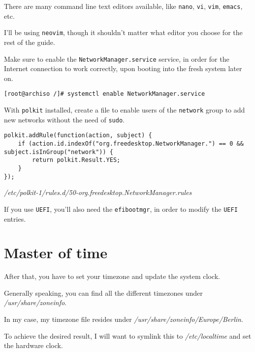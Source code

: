 \documentclass[10pt]{dustdoc}
\begin{document}
\begin{NOTE}
    There are many command line text editors available, like \texttt{nano}, \texttt{vi}, \texttt{vim}, \texttt{emacs}, etc.

    I’ll be using \texttt{neovim}, though it shouldn’t matter what editor you choose for the rest of the guide.
\end{NOTE}

Make sure to enable the \texttt{NetworkManager.service} service, in order for the Internet connection to work correctly, upon booting into the fresh system later on.

\begin{verbatim}
[root@archiso /]# systemctl enable NetworkManager.service
\end{verbatim}

With \texttt{polkit} installed, create a file to enable users of the \texttt{network} group to add new networks without the need of \texttt{sudo}.

\begin{mintedlisting}
    \begin{verbatim}
polkit.addRule(function(action, subject) {
    if (action.id.indexOf("org.freedesktop.NetworkManager.") == 0 && subject.isInGroup("network")) {
        return polkit.Result.YES;
    }
});
    \end{verbatim}

    \caption{\textit{/etc/polkit-1/rules.d/\allowbreak{}50-org.freedesktop.\allowbreak{}NetworkManager.rules}}
\end{mintedlisting}

If you use \texttt{UEFI}, you’ll also need the \texttt{efibootmgr}, in order to modify the \texttt{UEFI} entries.

\section{Master of time}
\label{sec:master-of-time}

After that, you have to set your timezone and update the system clock.

Generally speaking, you can find all the different timezones under \textit{/usr/\allowbreak{}share/\allowbreak{}zoneinfo}.

In my case, my timezone file resides under \textit{/usr/\allowbreak{}share/\allowbreak{}zoneinfo/\allowbreak{}Europe/\allowbreak{}Berlin}.

To achieve the desired result, I will want to symlink this to \textit{/etc/localtime} and set the hardware clock.
\end{document}
